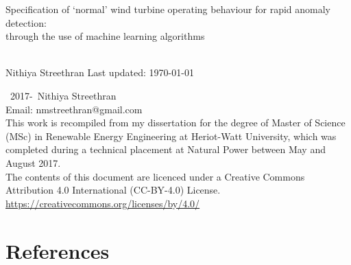 \documentclass[twoside,12pt,openany]{book}
\def\theauthor{Nithiya Streethran}
\def\thetitle{%
  Specification of \texorpdfstring{`}{'}normal' wind turbine operating
  behaviour for rapid anomaly detection:\texorpdfstring{\\}{}
  through the use of machine learning algorithms%
}
\begin{document}

\frontmatter

\begin{titlepage}
  \hspace{0pt}\vfill %
  \centering %
  \Large\thetitle
  \\[4cm]
  \large\theauthor
  \vfill
  Last updated: \today
  \vfill\hspace{0pt} %
\end{titlepage}

{\setlength{\parindent}{0pt}
\hspace{0pt}\vfill
\textcopyright~2017-\the\year{}~\theauthor
\\[.5cm]
Email: nmstreethran@gmail.com
\\[.5cm]
This work is recompiled from my dissertation for the degree of Master of Science
(MSc) in Renewable Energy Engineering at Heriot-Watt University, which was
completed during a technical placement at Natural Power between May and
August 2017.
\\[.5cm]
The contents of this document are licenced under a
Creative Commons Attribution 4.0 International (CC-BY-4.0) License. \\
\url{https://creativecommons.org/licenses/by/4.0/}
\vfill\hspace{0pt}
}

\onehalfspacing



\tableofcontents
\listoffigures
\listoftables



\themainmatter







{%
  \backmatter%
  \chapter{References}%
  \printbibliography[heading=none]%
}

\theappendix


\end{document}
